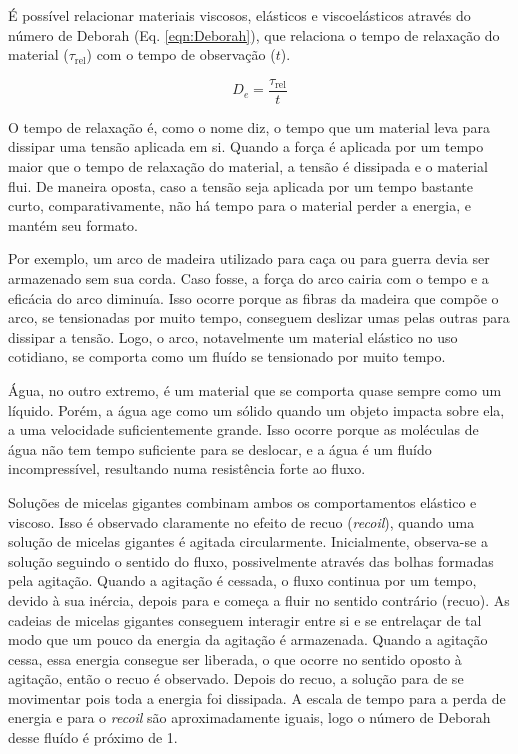 		É possível relacionar materiais viscosos, elásticos e viscoelásticos através do número de Deborah (Eq. \ref{eqn:Deborah}), que relaciona o tempo de relaxação do material (\(\tau_{\text{rel}}\)) com o tempo de observação (\(t\)).
		
		\begin{equation}
			D_e = \dfrac{\tau_{\text{rel}}}{t}
			\label{eqn:Deborah}
		\end{equation}
		
		O tempo de relaxação é, como o nome diz, o tempo que um material leva para dissipar uma tensão aplicada em si. Quando a força é aplicada por um tempo maior que o tempo de relaxação do material, a tensão é dissipada e o material flui. De maneira oposta, caso a tensão seja aplicada por um tempo bastante curto, comparativamente, não há tempo para o material perder a energia, e mantém seu formato.
		
		Por exemplo, um arco de madeira utilizado para caça ou para guerra devia ser armazenado sem sua corda. Caso fosse, a força do arco cairia com o tempo e a eficácia do arco diminuía. Isso ocorre porque as fibras da madeira que compõe o arco, se tensionadas por muito tempo, conseguem deslizar umas pelas outras para dissipar a tensão. Logo, o arco, notavelmente um material elástico no uso cotidiano, se comporta como um fluído se tensionado por muito tempo.
		
		Água, no outro extremo, é um material que se comporta quase sempre como um líquido. Porém, a água age como um sólido quando um objeto impacta sobre ela, a uma velocidade suficientemente grande. Isso ocorre porque as moléculas de água não tem tempo suficiente para se deslocar, e a água é um fluído incompressível, resultando numa resistência forte ao fluxo.
		
		Soluções de micelas gigantes combinam ambos os comportamentos elástico e viscoso. Isso é observado claramente no efeito de recuo (\emph{recoil}), quando uma solução de micelas gigantes é agitada circularmente. Inicialmente, observa-se a solução seguindo o sentido do fluxo, possivelmente através das bolhas formadas pela agitação. Quando a agitação é cessada, o fluxo continua por um tempo, devido à sua inércia, depois para e começa a fluir no sentido contrário (recuo). As cadeias de micelas gigantes conseguem interagir entre si e se entrelaçar de tal modo que um pouco da energia da agitação é armazenada. Quando a agitação cessa, essa energia consegue ser liberada, o que ocorre no sentido oposto à agitação, então o recuo é observado. Depois do recuo, a solução para de se movimentar pois toda a energia foi dissipada. A escala de tempo para a perda de energia e para o \emph{recoil} são aproximadamente iguais, logo o número de Deborah desse fluído é próximo de 1.
		
